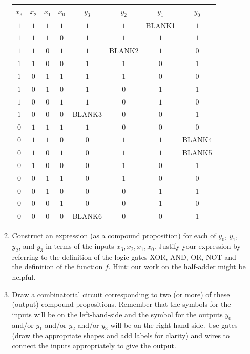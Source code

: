 \documentclass[12pt, oneside]{article}
\begin{document}
\begin{enumerate}[labelindent=0pt, leftmargin=0pt]
\begin{enumerate}
        \begin{center}
        \begin{tabular}{cccc|cccc}
        $x_3$ & $x_2$ & $x_1$ & $x_0$ & $y_3$ & $y_2$ & $y_1$ & $y_0$\\
        \hline
        $1$ & $1$ & $1$ & $1$ & $1$ & $1$ & BLANK1 & $1$\\
        $1$ & $1$ & $1$ & $0$ & $1$ & $1$ & $1$ & $1$\\
        $1$ & $1$ & $0$ & $1$ & $1$ & BLANK2 & $1$ & $0$\\
        $1$ & $1$ & $0$ & $0$ & $1$ & $1$ & $0$ & $1$\\
        $1$ & $0$ & $1$ & $1$ & $1$ & $1$ & $0$ & $0$\\
        $1$ & $0$ & $1$ & $0$ & $1$ & $0$ & $1$ & $1$\\
        $1$ & $0$ & $0$ & $1$ & $1$ & $0$ & $1$ & $0$\\
        $1$ & $0$ & $0$ & $0$ & BLANK3& $0$ & $0$ & $1$\\
        $0$ & $1$ & $1$ & $1$ & $1$ & $0$ & $0$ & $0$\\
        $0$ & $1$ & $1$ & $0$ & $0$ & $1$ & $1$ & BLANK4\\
        $0$ & $1$ & $0$ & $1$ & $0$ & $1$ & $1$ & BLANK5\\
        $0$ & $1$ & $0$ & $0$ & $0$ & $1$ & $0$ & $1$\\
        $0$ & $0$ & $1$ & $1$ & $0$ & $1$ & $0$ & $0$\\
        $0$ & $0$ & $1$ & $0$ & $0$ & $0$ & $1$ & $1$\\
        $0$ & $0$ & $0$ & $1$ & $0$ & $0$ & $1$ & $0$\\
        $0$ & $0$ & $0$ & $0$ & BLANK6 & $0$ & $0$ & $1$\\
        \end{tabular}
        \end{center}
  
        \item
        Construct an expression (as a compound proposition) for each of $y_0$, $y_1$, $y_2$, and $y_3$ in terms of the inputs 
        $x_3, x_2, x_1, x_0$. Justify your expression by referring to the definition of the logic 
        gates XOR, AND, OR, NOT and the definition of the function $f$. Hint: our work on the half-adder might 
        be helpful.
       
        \item Draw a combinatorial circuit corresponding to two (or more) of these (output) compound propositions.
        Remember that the symbols for the inputs will be on the left-hand-side and 
        the symbol for the outputs $y_0$ and/or $y_1$ and/or $y_2$ and/or $y_3$ will be on the right-hand side. Use gates (draw the appropriate
        shapes and add labels for clarity) and wires to connect the inputs appropriately to give the output.


\end{enumerate}
\end{enumerate}
\end{document}
